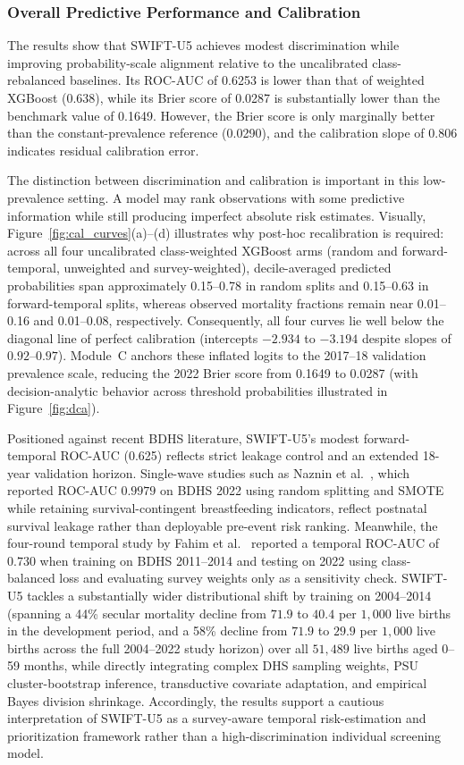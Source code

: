 \documentclass[a4paper,fleqn]{cas-sc}
\begin{document}
\subsubsection{Overall Predictive Performance and Calibration}

The results show that SWIFT-U5 achieves modest discrimination while improving probability-scale alignment relative to the uncalibrated class-rebalanced baselines. Its ROC-AUC of 0.6253 is lower than that of weighted XGBoost (0.638), while its Brier score of 0.0287 is substantially lower than the benchmark value of 0.1649. However, the Brier score is only marginally better than the constant-prevalence reference (0.0290), and the calibration slope of 0.806 indicates residual calibration error.

The distinction between discrimination and calibration is important in this low-prevalence setting. A model may rank observations with some predictive information while still producing imperfect absolute risk estimates. Visually, Figure~\ref{fig:cal_curves}(a)--(d) illustrates why post-hoc recalibration is required: across all four uncalibrated class-weighted XGBoost arms (random and forward-temporal, unweighted and survey-weighted), decile-averaged predicted probabilities span approximately 0.15--0.78 in random splits and 0.15--0.63 in forward-temporal splits, whereas observed mortality fractions remain near 0.01--0.16 and 0.01--0.08, respectively. Consequently, all four curves lie well below the diagonal line of perfect calibration (intercepts $-2.934$ to $-3.194$ despite slopes of $0.92$--$0.97$). Module~C anchors these inflated logits to the 2017--18 validation prevalence scale, reducing the 2022 Brier score from 0.1649 to 0.0287 (with decision-analytic behavior across threshold probabilities illustrated in Figure~\ref{fig:dca}).

Positioned against recent BDHS literature, SWIFT-U5's modest forward-temporal ROC-AUC (0.625) reflects strict leakage control and an extended 18-year validation horizon. Single-wave studies such as Naznin et al.~\cite{naznin2025}, which reported ROC-AUC $0.9979$ on BDHS 2022 using random splitting and SMOTE while retaining survival-contingent breastfeeding indicators, reflect postnatal survival leakage rather than deployable pre-event risk ranking. Meanwhile, the four-round temporal study by Fahim et al.~\cite{fahim2026} reported a temporal ROC-AUC of $0.730$ when training on BDHS 2011--2014 and testing on 2022 using class-balanced loss and evaluating survey weights only as a sensitivity check. SWIFT-U5 tackles a substantially wider distributional shift by training on 2004--2014 (spanning a 44\% secular mortality decline from $71.9$ to $40.4$ per $1{,}000$ live births in the development period, and a 58\% decline from $71.9$ to $29.9$ per $1{,}000$ live births across the full 2004--2022 study horizon) over all $51{,}489$ live births aged 0--59 months, while directly integrating complex DHS sampling weights, PSU cluster-bootstrap inference, transductive covariate adaptation, and empirical Bayes division shrinkage. Accordingly, the results support a cautious interpretation of SWIFT-U5 as a survey-aware temporal risk-estimation and prioritization framework rather than a high-discrimination individual screening model.
\end{document}
